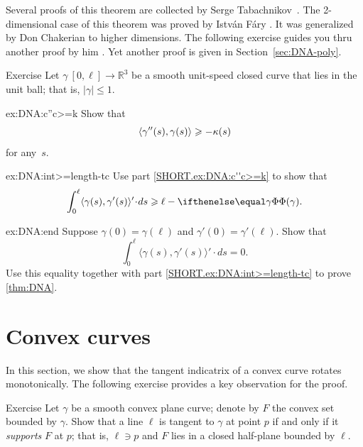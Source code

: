 Several proofs of this theorem are collected by Serge Tabachnikov~\cite{tabachnikov}.
The 2-dimensional case of this theorem was proved by Istv\'{a}n F\'{a}ry \cite{fary1950}.
It was generalized by Don Chakerian \cite{chakerian1962} to higher dimensions.
The following exercise guides you thru another proof by him \cite{chakerian1964}.
Yet another proof is given in Section~\ref{sec:DNA-poly}.

\begin{thm}{Exercise}\label{ex:DNA}
Let $\gamma\:[0,\ell]\to\mathbb{R}^3$ be a smooth unit-speed closed curve that lies in the unit ball; that is, $|\gamma|\le 1$.

\begin{subthm}{ex:DNA:c''c>=k}
Show that 
\[\langle\gamma''(s),\gamma(s)\rangle\geqslant-\kappa(s)\]
for any~$s$.
\end{subthm}

\begin{subthm}{ex:DNA:int>=length-tc}
Use part \ref{SHORT.ex:DNA:c''c>=k} to show that 
\[\int_0^\ell\langle\gamma(s),\gamma'(s)\rangle'\cdot ds\ge
\ell-\tc\gamma.\]

\end{subthm}

\begin{subthm}{ex:DNA:end}
Suppose $\gamma(0)=\gamma(\ell)$ and $\gamma'(0)=\gamma'(\ell)$.
Show that 
\[\int_0^\ell\langle\gamma(s),\gamma'(s)\rangle'\cdot ds=0.\]
Use this equality together with  part \ref{SHORT.ex:DNA:int>=length-tc} to prove \ref{thm:DNA}.
\end{subthm}
\end{thm}

\section{Convex curves}

In this section, we show that the tangent indicatrix of a convex curve rotates monotonically. 
The following exercise provides a key observation for the proof.

\begin{thm}{Exercise}\label{ex:tangent-support}
Let $\gamma$ be a smooth convex plane curve;
denote by $F$ the convex set bounded by $\gamma$.
Show that a line $\ell$ is tangent to $\gamma$ at point $p$ if and only if it \emph{supports} $F$ at $p$;
that is, $\ell\ni p$ and $F$ lies in a closed half-plane bounded by $\ell$.
\end{thm}

